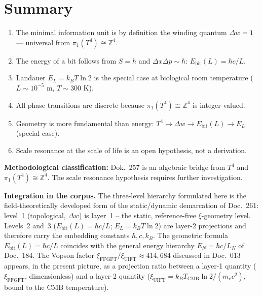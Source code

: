\section{Summary}

\begin{enumerate}
  \item The minimal information unit is by definition the winding
        quantum \(\Delta w = 1\) — universal from
        \(\pi_1(T^4) \cong \mathbb{Z}^4\).
  \item The energy of a bit follows from \(S = h\) and
        \(\Delta x\Delta p \sim \hbar\):
        \(E_\text{bit}(L) = \hbar c / L\).
  \item Landauer \(E_L = k_BT\ln2\) is the special case
        at biological room temperature (\(L \sim 10^{-5}\) m,
        \(T \sim 300\) K).
  \item All phase transitions are discrete because
        \(\pi_1(T^4) \cong \mathbb{Z}^4\) is integer-valued.
  \item Geometry is more fundamental than energy:
        \(T^4 \to \Delta w \to E_\text{bit}(L) \to E_L\) (special case).
  \item Scale resonance at the scale of life is an open hypothesis,
        not a derivation.
\end{enumerate}

\bigskip
\noindent
\textbf{Methodological classification:}
Dok.~257 is an algebraic bridge from \(T^4\) and
\(\pi_1(T^4) \cong \mathbb{Z}^4\).
The scale resonance hypothesis requires further investigation.

\bigskip
\noindent
\textbf{Integration in the corpus.}
The three-level hierarchy formulated here is the field-theoretically
developed form of the static/dynamic demarcation of Doc.~261:
level~1 (topological, \(\Delta w\)) is layer~1 -- the static,
reference-free \(\xi\)-geometry level. Levels~2 and~3
(\(E_\text{bit}(L) = \hbar c/L\); \(E_L = k_B T \ln 2\)) are layer-2
projections and therefore carry the embedding constants
\(\hbar, c, k_B\). The geometric formula \(E_\text{bit}(L) = \hbar c/L\)
coincides with the general energy hierarchy \(E_N = \hbar c/L_N\) of
Doc.~184. The Vopson factor
\(\xi_\text{FFGFT}/\xi_\text{UIFT} \approx 414{,}684\) discussed in
Doc.~013 appears, in the present picture, as a projection ratio between
a layer-1 quantity (\(\xi_\text{FFGFT}\), dimensionless) and a layer-2
quantity (\(\xi_\text{UIFT} = k_B T_\text{CMB}\ln 2/(m_e c^2)\), bound
to the CMB temperature).

